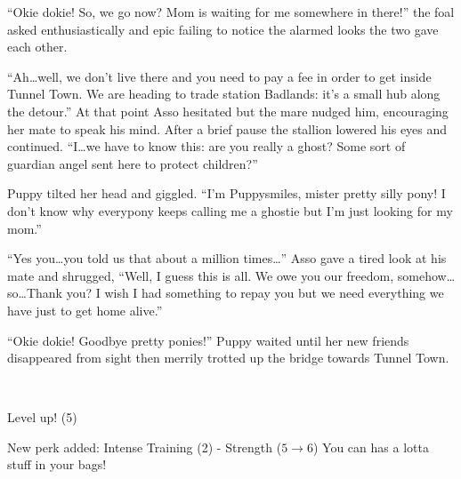 ``Okie dokie! So, we go now? Mom is waiting for me somewhere in there!'' the foal asked enthusiastically and epic failing to notice the alarmed looks the two gave each other.

``Ah\dots well, we don't live there and you need to pay a fee in order to get inside Tunnel Town. We are heading to trade station Badlands: it's a small hub along the detour.'' At that point Asso hesitated but the mare nudged him, encouraging her mate to speak his mind. After a brief pause the stallion lowered his eyes and continued. ``I\dots we have to know this: are you really a ghost? Some sort of guardian angel sent here to protect children?''

Puppy tilted her head and giggled. ``I'm Puppysmiles, mister pretty silly pony! I don't know why everypony keeps calling me a ghostie but I'm just looking for my mom.''

``Yes you\dots you told us that about a million times\dots'' Asso gave a tired look at his mate and shrugged, ``Well, I guess this is all. We owe you our freedom, somehow\dots so\dots Thank you? I wish I had something to repay you but we need everything we have just to get home alive.''

``Okie dokie! Goodbye pretty ponies!'' Puppy waited until her new friends disappeared from sight then merrily trotted up the bridge towards Tunnel Town.

~\vfill

\begin{engnote}
Level up! (5)

New perk added: Intense Training (2) - Strength ($5 \to 6$) You can has a lotta stuff in your bags!
\end{engnote}



